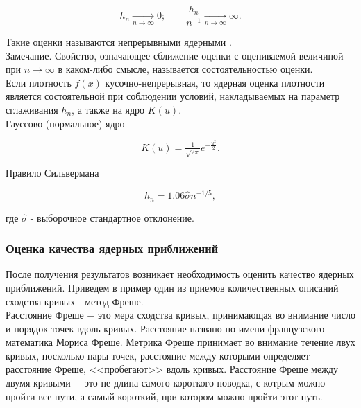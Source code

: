 \documentclass[a4paper,14pt]{article}
\begin{document}
	\begin{equation}
		h_n \underset{n \to \infty}{\longrightarrow} 0; \qquad \dfrac{h_n}{n^{-1}} \underset{n \to \infty}{\longrightarrow} \infty.
	\end{equation}
	
	Такие оценки называются непрерывными ядерными \cite[с. 421-423]{b:probSectMath}.\\
	
	Замечание. Свойство, означающее сближение оценки с оцениваемой величиной при $n \rightarrow \infty$ в каком-либо смысле, называется состоятельностью оценки.\\
	
	Если плотность $f(x)$ кусочно-непрерывная, то ядерная оценка плотности является состоятельной при соблюдении условий, накладываемых на параметр сглаживания $h_n$, а также на ядро $K(u)$.\\
	
	Гауссово (нормальное) ядро \cite[с. 38]{a:nonParamRegr}
	
	\begin{equation}
		K(u) = \tfrac{1}{\sqrt{2\pi}}e^{-\tfrac{u^2}{2}}.
	\end{equation}
	
	Правило Сильвермана \cite[с. 44]{a:nonParamRegr}
	
	\begin{equation}
		h_n = 1.06\hat{\sigma}n^{-1/5},
	\end{equation}
	
	где $\hat{\sigma}$ - выборочное стандартное отклонение.
	
	\subsubsection{Оценка качества ядерных приближений}
	
	После получения результатов возникает необходимость оценить качество ядерных приближений. Приведем в пример один из приемов количественных описаний сходства кривых - метод Фреше. \\
	
	Расстояние Фреше $-$ это мера сходства кривых, принимающая во внимание число и порядок точек вдоль кривых. Расстояние названо по имени французского математика Мориса Фреше.
	Метрика Фреше принимает во внимание течение лвух кривых, посколько пары точек, расстояние между которыми определяет расстояние Фреше, <<пробегают>> вдоль кривых.
	Расстояние Фреше между двумя кривыми $-$ это не длина самого короткого поводка, с котрым можно пройти все пути, а самый короткий, при котором можно пройти этот путь. \\
	
\end{document}
